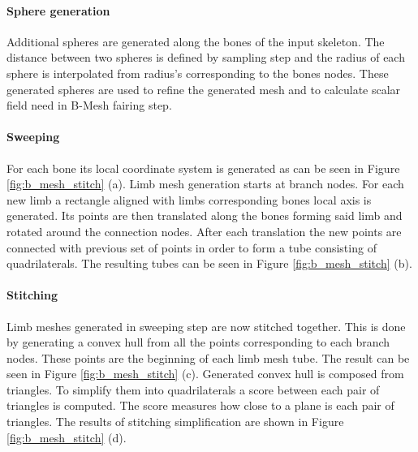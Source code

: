 \paragraph{Sphere generation}
Additional spheres are generated along the bones of the input skeleton. The distance between two spheres is defined by sampling step and the radius of each sphere is interpolated from radius's corresponding to the bones nodes. These generated spheres are used to refine the generated mesh and to calculate scalar field need in B-Mesh fairing step.

\paragraph{Sweeping}
For each bone its local coordinate system is generated as can be seen in Figure \ref{fig:b_mesh_stitch} (a). Limb mesh generation starts at branch nodes. For each new limb a rectangle aligned with limbs corresponding bones local axis is generated. Its points are then translated along the bones forming said limb and rotated around the connection nodes. After each translation the new points are connected with previous set of points in order to form a tube consisting of quadrilaterals. The resulting tubes can be seen in Figure \ref{fig:b_mesh_stitch} (b).

\paragraph{Stitching}
Limb meshes generated in sweeping step are now stitched together. This is done by generating a convex hull from all the points corresponding to each branch nodes. These points are the beginning of each limb mesh tube. The result can be seen in Figure \ref{fig:b_mesh_stitch} (c). Generated convex hull is composed from triangles. To simplify them into quadrilaterals a score between each pair of triangles is computed. The score measures how close to a plane is each pair of triangles. The results of stitching simplification are shown in Figure \ref{fig:b_mesh_stitch} (d).

